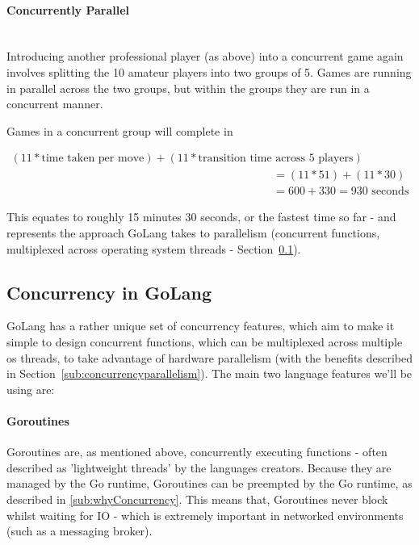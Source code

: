 \paragraph{Concurrently Parallel} \mbox{}\\

Introducing another professional player (as above) into a concurrent game again
involves splitting the 10 amateur players into two groups of 5. Games are
running in parallel across the two groups, but within the groups they are run in
a concurrent manner.

Games in a concurrent group will complete in

\begin{equation}
  \begin{split}
    (11 * \text{time taken per move}) + (11 * \text{transition time across 5 players}) \\
    &= (11 * 51) + (11 * 30) \\
    &= 600 + 330 = 930 \text{ seconds}
  \end{split}
\end{equation}

This equates to roughly 15 minutes 30 seconds, or the fastest time so far - and
represents the approach GoLang takes to parallelism (concurrent functions,
multiplexed across operating system threads -
Section~\ref{sub:golangConcurrency}).

\subsection{Concurrency in GoLang}
\label{sub:golangConcurrency}

GoLang has a rather unique set of concurrency features, which aim to make it
simple to design concurrent functions, which can be multiplexed across multiple
\gls{os} threads, to take advantage of hardware parallelism (with the benefits
described in Section~\ref{sub:concurrencyparallelism}). The main two language features we'll be using are:

\paragraph{Goroutines}

Goroutines are, as mentioned above, concurrently executing functions - often
described as 'lightweight threads' by the languages creators. Because they are
managed by the Go runtime, Goroutines can be \gls{preempted} by the Go runtime,
as described in \ref{sub:whyConcurrency}. This means that, Goroutines never
block whilst waiting for IO - which is extremely important in networked
environments (such as a messaging broker).

